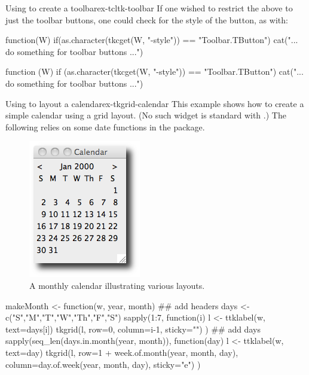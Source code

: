 \begin{example}{Using  to create a toolbar}{ex-tcltk-toolbar}
If one wished to restrict the above to just the toolbar buttons, one
could check for the style of the button, as with:

\begin{Schunk}
\begin{Sinput}
 function(W) {
   if(as.character(tkcget(W, "-style")) == "Toolbar.TButton")
     cat("... do something for toolbar buttons ...")
 }
\end{Sinput}
\begin{Soutput}
function (W) 
{
    if (as.character(tkcget(W, "-style")) == "Toolbar.TButton") 
        cat("... do something for toolbar buttons ...")
}
\end{Soutput}
\end{Schunk}
\end{example}

\begin{example}{Using  to layout a calendar}{ex-tkgrid-calendar}
This example shows how to create a simple calendar using a grid
layout. (No such widget is standard with .) The following
relies on some date functions in the  package.




\begin{figure}
  \centering
  \includegraphics[width=.35\textwidth]{fig-tcltk-grid-calendar}
  \caption{A monthly calendar illustrating various layouts.}
  \label{fig:qt-gridlayout-calendar}
\end{figure}


\begin{Schunk}
\begin{Sinput}
 makeMonth <- function(w, year, month) {
   ## add headers
   days <- c("S","M","T","W","Th","F","S")
   sapply(1:7, function(i) {
     l <- ttklabel(w, text=days[i])       
     tkgrid(l, row=0, column=i-1, sticky="")
   })
   ## add days
   sapply(seq_len(days.in.month(year, month)),  function(day) {
     l <- ttklabel(w, text=day)
     tkgrid(l, row=1 + week.of.month(year, month, day),
            column=day.of.week(year, month, day),
            sticky="e")
   })
 }
\end{Sinput}
\end{Schunk}


\end{example}
